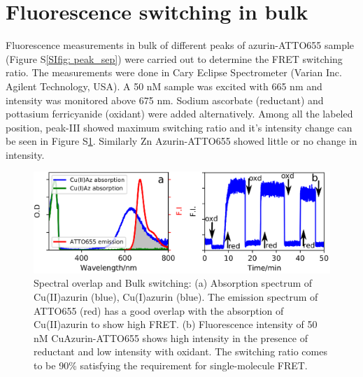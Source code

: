 \documentclass[11pt,a4paper,onecolumn]{article}
\begin{document}
\section{Fluorescence switching in bulk}
Fluorescence measurements in bulk of different peaks of azurin-ATTO655 sample (Figure S\ref{SIfig: peak_sep}) were carried out to determine the FRET switching ratio. The measurements were done in Cary Eclipse Spectrometer (Varian Inc. Agilent Technology, USA). A 50 nM sample was excited with 665 nm and intensity was monitored above 675 nm. Sodium ascorbate (reductant) and pottasium ferricyanide (oxidant) were added alternatively. Among all the labeled position, peak-III showed maximum switching ratio and it's intensity change can be seen in Figure S\ref{SIfig: switching}. Similarly Zn Azurin-ATTO655 showed little or no change in intensity.
\begin{figure}
  \centering
  \includegraphics{spectral_overlap_switching.eps}
  \makeatletter
  \renewcommand{\fnum@figure}{\figurename~S\thefigure}
  \makeatother
  \caption{Spectral overlap and Bulk switching: (a) Absorption spectrum of Cu(II)azurin (blue), Cu(I)azurin (blue). The emission spectrum of ATTO655 (red) has a good overlap with the absorption of Cu(II)azurin to show high FRET. (b) Fluorescence intensity of 50 nM CuAzurin-ATTO655 shows high intensity in the presence of reductant and low intensity with oxidant. The switching ratio comes to be 90\% satisfying the requirement for single-molecule FRET.}
  \label{SIfig: switching}
\end{figure}
\end{document}
